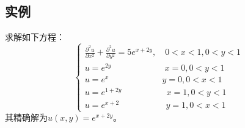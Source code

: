 \documentclass{ctexart}
\begin{document}
\subsection{实例}
求解如下方程：
\begin{equation}%
    \begin{cases}
        \frac{\partial^2 u}{\partial x^2} + \frac{\partial^2 u}{\partial y^2} = 5e^{x+2y}, \quad 0<x<1, 0<y<1\\
        u = e^{2y} \quad\  \quad \quad \quad\quad\quad x=0,0<y<1\\
u = e^{x} \quad  \quad \ \quad\quad\quad\quad y=0,0<x<1\\
u = e^{1+2y} \quad \ \quad\quad\quad\quad x=1,0<y<1\\
u = e^{x+2} \quad \ \ \quad\quad\quad\quad y=1,0<x<1
    \end{cases}	
\end{equation}
其精确解为$u(x,y)=e^{x+2y}$。
\end{document}
